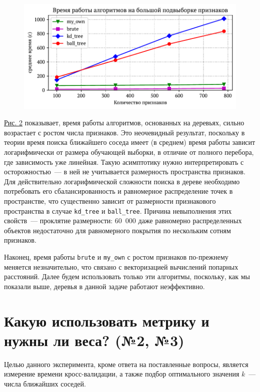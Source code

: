 \documentclass[12pt]{article}
\begin{document}
\begin{figure}[h]
    \includegraphics{n1_2}
    \caption{}
    \label{fig:time2}
\end{figure}

\hyperref[fig:time2]{Рис. 2} показывает, время работы алгоритмов, основанных на деревьях, сильно возрастает с ростом числа признаков. Это неочевидный результат, поскольку в теории время поиска ближайшего соседа имеет (в среднем) время работы зависит логарифмически от размера обучающей выборки, в отличие от полного перебора, где зависимость уже линейная. Такую асимптотику нужно интерпретировать с осторожностью~--- в ней не учитывается размерность пространства признаков. Для действительно логарифмической сложности поиска в дереве необходимо потребовать его сбалансированность и равномерное распределение точек в пространстве, что существенно зависит от размерности признакового пространства в случае \verb|kd_tree| и \verb|ball_tree|. Причина невыполнения этих свойств~--- проклятие размерности: 60~000 даже равномерно распределенных объектов недостаточно для равномерного покрытия по нескольким сотням признаков.

Наконец, время работы \verb|brute| и \verb|my_own| с ростом признаков по-прежнему меняется незначительно, что связано с векторизацией вычислений попарных расстояний. Далее будем использовать только эти алгоритмы, поскольку, как мы показали выше, деревья в данной задаче работают неэффективно.

\section{Какую использовать метрику и нужны ли веса? (№2, №3)}

Целью данного эксперимента, кроме ответа на поставленные вопросы, является измерение времени кросс-валидации, а также подбор оптимального значения $k$~--- числа ближайших соседей.
\end{document}
